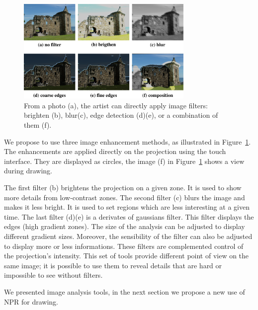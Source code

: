 \documentclass{sigchi}
\begin{document}
\begin{figure}[h!]
  \centering 
  \includegraphics[width=85mm]{6maisons.pdf}
  \caption{ From a photo (a), the artist can directly apply image
    filters: brighten (b), blur(c), edge detection (d)(e), or a
    combination of them (f).}
  \label{fig:synthese}
\end{figure}
     

We propose to use three image enhancement methods, as illustrated in
Figure~\ref{fig:synthese}. The enhancements are applied directly on
the projection using the touch interface. They are displayed as
circles, the image (f) in Figure~\ref{fig:synthese} shows a
view during drawing. 

The first filter (b) brightens the projection on a given zone. It is
used to show more details from low-contrast zones. 
The second filter (c) blurs the image and makes it less bright. It is
used to set regions which are less interesting at a given time. 
The last filter (d)(e) is a derivates of gaussians filter. This filter
displays the edges (high gradient zones). The size of the analysis can
be adjusted to display different gradient sizes. Moreover, the
sensibility of the filter can also be adjusted to display more or less
informations. These filters are complemented control of the
projection's intensity.  This set of tools provide different point of
view on the same image; it is possible to use them to reveal details
that are hard or impossible to see without filters. 


We presented image analysis tools, in the next section we propose a
new use of NPR for drawing. 


\end{document}
